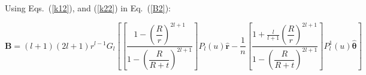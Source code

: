 Using Eqs.~(\ref{k12}), and (\ref{k22}) in Eq.~(\ref{B2}):




$$\bm B= (l+1)(2l+1)r^{l-1}G_l\left[\left[\frac{1-\left(\dfrac{R}{r}\right)^{2l+1}}{1-\left(\dfrac{R}{R+t}\right)^{2l+1}}\right] P_l(u) \bm{\hat{r}} -\frac{1}{n}\left[\frac{1+\frac{l}{l+1}\left(\dfrac{R}{r}\right)^{2l+1}}{1-\left(\dfrac{R}{R+t}\right)^{2l+1}}\right] P_l^1(u) \bm{\hat{\theta}}\right]$$




